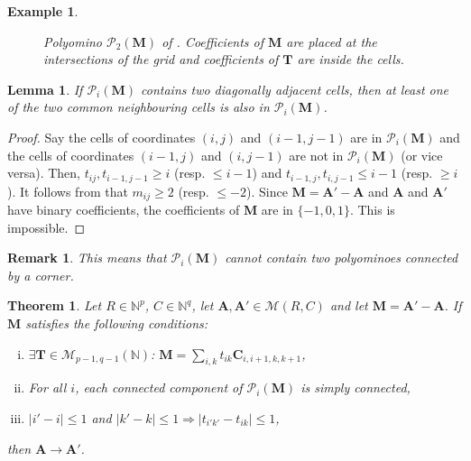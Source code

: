 \documentclass{article}
\newtheorem{theorem}{Theorem}
\newtheorem{lemma}{Lemma}
\newtheorem{remark}{Remark}
\newtheorem{example}{Example}
\newcommand{\N}{\mathbb{N}}
\newcommand{\MM}{\mathcal M}
\renewcommand{\P}{\mathcal P}
\newcommand{\rar}{\rightarrow}
\newcommand{\imp}{\Rightarrow}
\newcommand{\A}{\mathbf A}
\newcommand{\C}{\mathbf C}
\newcommand{\M}{\mathbf M}
\newcommand{\T}{\mathbf T}
\begin{document}
\begin{example}
\begin{figure}[ht]
\begin{center}
    
    \end{center}
    \caption{Polyomino $\P_2(\M)$ of . Coefficients of $\M$ are placed at the intersections of the grid and coefficients of $\T$ are inside the cells.}
    \label{fig.polyomino}
\end{figure}

\end{example}



\begin{lemma}\label{no diag touching}
If $\P_i(\M)$ contains two diagonally adjacent cells, then at least one of the two common neighbouring cells is also in $\P_i(\M)$.
\end{lemma}

\begin{proof}
Say the cells of coordinates $(i,j)$ and $(i-1,j-1)$ are in $\P_i(\M)$ and the cells of coordinates $(i-1,j)$ and $(i,j-1)$ are not in $\P_i(\M)$ (or vice versa). Then, $t_{ij},t_{i-1,j-1}\geq i$ (resp. $\leq i-1$) and $t_{i-1,j},t_{i,j-1}\leq i-1$ (resp. $\geq i$). It follows from  that $m_{ij}\geq 2$ (resp. $\leq -2$). Since $\M=\A'-\A$ and $\A$ and $\A'$ have binary coefficients, the coefficients of $\M$ are in $\{-1,0,1\}$. This is impossible.
\end{proof}

\begin{remark}\label{touching polyo}
This means that $\P_i(\M)$ cannot contain two polyominoes connected by a corner.
\end{remark}

\begin{theorem}\label{SC}
Let $R\in \N^p$, $C\in \N^q$, let $\A,\A' \in \MM(R,C)$ and let $\M=\A'-\A$. If $\M$ satisfies the following conditions:
\begin{enumerate}[(i)]
    \item $\exists \T\in \MM_{p-1,q-1}(\N)$: $\M=\sum_{i,k} t_{ik}\C_{i,i+1,k,k+1}$,
    \item For all $i$, each connected component of $\P_i(\M)$ is simply connected,
    \item $|i'-i|\leq 1$ and $|k'-k|\leq 1 \imp |t_{i'k'}-t_{ik}|\leq 1$,
\end{enumerate}
then $\A\rar \A'$.
\end{theorem}
\end{document}
